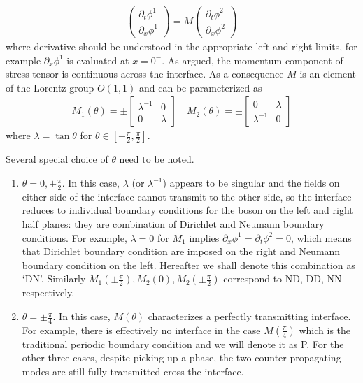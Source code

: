 \begin{equation}\begin{aligned}
\label{eq:def_M}
\begin{pmatrix}
\partial_t\phi^1\\
\partial_x\phi^1
\end{pmatrix}
=M\begin{pmatrix}
\partial_t\phi^2\\
\partial_x\phi^2
\end{pmatrix}
\end{aligned}\end{equation}
where derivative should be understood in the appropriate left and right limits, for example $\partial_x \phi^1$ is evaluated at $ x = 0^-$. As argued, the momentum component of stress tensor is continuous across the interface. As a consequence $M$ is an element of the Lorentz group $O(1,1)$ and can be parameterized as
\begin{equation}\begin{aligned}
\label{eq:M1M2}
M_1(\theta)=\pm
\begin{bmatrix}
\lambda^{-1} & 0 \\
0 & \lambda
\end{bmatrix}\quad
M_2(\theta)=\pm
\begin{bmatrix}
0 & \lambda  \\
\lambda^{-1} & 0 
\end{bmatrix}
\end{aligned}\end{equation}
where $\lambda=\tan\theta$ for $\theta\in\left[-\frac{\pi}{2},\frac{\pi}{2}\right]$. 

Several special choice of $\theta$ need to be noted. 
\begin{enumerate}
\item $\theta=0,\pm \frac{\pi}{2}$. In this case, $\lambda$ (or $\lambda^{-1}$) appears to be singular and the fields on either side of the interface cannot transmit to the other side, so the interface reduces to individual boundary conditions for the boson on the left and right half planes: they are combination of Dirichlet and Neumann boundary conditions. For example, $\lambda = 0$ for $M_1$ implies $\partial_x\phi^1 = \partial_t\phi^2 =0$, which means that Dirichlet boundary condition are imposed on the right and Neumann boundary condition on the left. Hereafter we shall denote this combination as `DN'. Similarly $M_1(\pm\frac{\pi}{2}),M_2(0),M_2(\pm \frac{\pi}{2})$ correspond to ND, DD, NN respectively. 
\item $\theta = \pm \frac{\pi}{4}$. In this case, $M(\theta)$ characterizes a perfectly transmitting interface. For example, there is effectively no interface in the case $M( \frac{\pi}{4})$ which is the traditional periodic boundary condition and we will denote it as P. For the other three cases, despite picking up a phase, the two counter propagating modes are still fully transmitted cross the interface. 
\end{enumerate}


